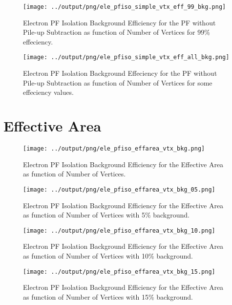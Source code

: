 \documentclass[11pt]{book}
\begin{document}
\begin{figure}[htb]
\centering
\texttt{[image: ../output/png/ele\_pfiso\_simple\_vtx\_eff\_99\_bkg.png]}
\caption{Electron PF Isolation Background Efficiency for the PF without Pile-up Subtraction as function of Number of Vertices for 99\% effeciency.}
\label{fig:ele_pfiso_vtx_eff_simple_eff_99_bkg}
\end{figure}

\begin{figure}[htb]
\centering
\texttt{[image: ../output/png/ele\_pfiso\_simple\_vtx\_eff\_all\_bkg.png]}
\caption{Electron PF Isolation Background Effeciency for the PF without Pile-up Subtraction as function of Number of Vertices for some effeciency values.}
\label{fig:ele_pfiso_vtx_eff_simple_eff_all_bkg}
\end{figure}
\clearpage

\section{Effective Area}
\begin{figure}[htb]
\centering
\texttt{[image: ../output/png/ele\_pfiso\_effarea\_vtx\_bkg.png]}
\caption{Electron PF Isolation Background Efficiency for the Effective Area as function of Number of Vertices.}
\label{fig:ele_pfiso_vtx_bkg_effarea}
\end{figure}

\begin{figure}[htb]
\centering
\texttt{[image: ../output/png/ele\_pfiso\_effarea\_vtx\_bkg\_05.png]}
\caption{Electron PF Isolation Background Efficiency for the Effective Area as function of Number of Vertices with 5\% background.}
\label{fig:ele_pfiso_vtx_bkg_effarea_bkg_05}
\end{figure}

\begin{figure}[htb]
\centering
\texttt{[image: ../output/png/ele\_pfiso\_effarea\_vtx\_bkg\_10.png]}
\caption{Electron PF Isolation Background Efficiency for the Effective Area as function of Number of Vertices with 10\% background.}
\label{fig:ele_pfiso_vtx_bkg_effarea_bkg_10}
\end{figure}

\begin{figure}[htb]
\centering
\texttt{[image: ../output/png/ele\_pfiso\_effarea\_vtx\_bkg\_15.png]}
\caption{Electron PF Isolation Background Efficiency for the Effective Area as function of Number of Vertices with 15\% background.}
\label{fig:ele_pfiso_vtx_bkg_effarea_bkg_15}
\end{figure}
\end{document}
